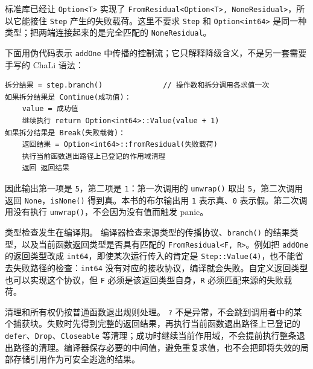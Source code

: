 标准库已经让 \texttt{Option<\allowbreak{}T>\allowbreak{}} 实现了 \texttt{From\allowbreak{}Residual<\allowbreak{}Option<\allowbreak{}T>\allowbreak{},\allowbreak{} None\allowbreak{}Residual>\allowbreak{}}，所以它能接住 \texttt{Step} 产生的失败载荷。这里不要求 \texttt{Step} 和 \texttt{Option<\allowbreak{}int64>\allowbreak{}} 是同一种类型；把两端连接起来的是完全匹配的 \texttt{None\allowbreak{}Residual}。

下面用伪代码表示 \texttt{add\allowbreak{}One} 中传播的控制流；它只解释降级含义，不是另一套需要手写的 ChaLi 语法：

\par
\medskip
\begin{lstlisting}[style=out]
拆分结果 = step.branch()              // 操作数和拆分调用各求值一次
如果拆分结果是 Continue(成功值)：
    value = 成功值
    继续执行 return Option<int64>::Value(value + 1)
如果拆分结果是 Break(失败载荷)：
    返回结果 = Option<int64>::fromResidual(失败载荷)
    执行当前函数退出路径上已登记的作用域清理
    返回 返回结果
\end{lstlisting}
\par
\medskip

因此输出第一项是 \texttt{5}，第二项是 \texttt{1}：第一次调用的 \texttt{unwrap(\allowbreak{})\allowbreak{}} 取出 \texttt{5}，第二次调用返回 \texttt{None}，\texttt{is\allowbreak{}None(\allowbreak{})\allowbreak{}} 得到真。本书的布尔输出用 \texttt{1} 表示真、\texttt{0} 表示假。第二次调用没有执行 \texttt{unwrap(\allowbreak{})\allowbreak{}}，不会因为没有值而触发 panic。

类型检查发生在编译期。 编译器检查来源类型的传播协议、\texttt{branch(\allowbreak{})\allowbreak{}} 的结果类型，以及当前函数返回类型是否具有匹配的 \texttt{From\allowbreak{}Residual<\allowbreak{}F,\allowbreak{} R>\allowbreak{}}。例如把 \texttt{add\allowbreak{}One} 的返回类型改成 \texttt{int64}，即使某次运行传入的肯定是 \texttt{Step:\allowbreak{}:\allowbreak{}Value(\allowbreak{}4)\allowbreak{}}，也不能省去失败路径的检查：\texttt{int64} 没有对应的接收协议，编译就会失败。自定义返回类型也可以实现这个协议，但 \texttt{F} 必须是该返回类型自身，\texttt{R} 必须匹配来源的失败载荷。

清理和所有权仍按普通函数退出规则处理。 \texttt{?} 不是异常，不会跳到调用者中的某个捕获块。失败时先得到完整的返回结果，再执行当前函数退出路径上已登记的 \texttt{defer}、\texttt{Drop}、\texttt{Closeable} 等清理；成功时继续当前作用域，不会提前执行整条退出路径的清理。编译器保存必要的中间值，避免重复求值，也不会把即将失效的局部存储引用作为可安全逃逸的结果。

